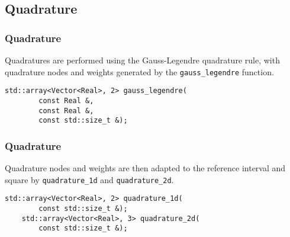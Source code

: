 









\subsection{Quadrature}

\begin{frame}[fragile]
    \frametitle{Quadrature}

    Quadratures are performed using the Gauss-Legendre quadrature rule, with quadrature nodes and weights generated by the \lstinline{gauss_legendre} function.

    \begin{lstlisting}[style=cpp]
    std::array<Vector<Real>, 2> gauss_legendre(
        const Real &, 
        const Real &, 
        const std::size_t &);
    \end{lstlisting}
\end{frame}

\begin{frame}[fragile]
    \frametitle{Quadrature}

    Quadrature nodes and weights are then adapted to the reference interval and square by \lstinline{quadrature_1d} and \lstinline{quadrature_2d}.

    \begin{lstlisting}[style=cpp]
    std::array<Vector<Real>, 2> quadrature_1d(
        const std::size_t &);
    std::array<Vector<Real>, 3> quadrature_2d(
        const std::size_t &);
    \end{lstlisting}
\end{frame}